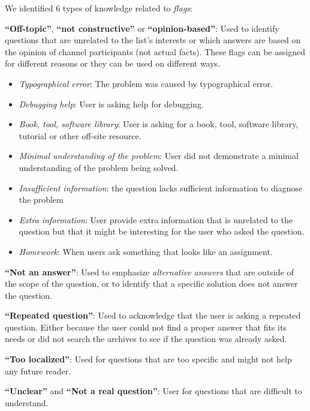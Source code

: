 \documentclass{sig-alternate-05-2015}
\begin{document}
	We identified 6 types of knowledge related to \textit{flags}:
	\begin{packed_enum}
		\item \textbf{``Off-topic''}, \textbf{``not constructive''} or \textbf{``opinion-based''}: Used to identify questions that are unrelated to the list's interests or which answers are based on the opinion of channel participants (not actual facts).
		These flags can be assigned for different reasons or they can be used on different ways.
		\begin{itemize}
			\item \textit{Typographical error}: The problem was caused by typographical error.
			\item \textit{Debugging help}: User is asking help for debugging.
			\item \textit{Book, tool, software library}: User is asking for a book, tool, software library, tutorial or other off-site resource.
			\item \textit{Minimal understanding of the problem}: User did not demonstrate a minimal understanding of the problem being solved.
			\item \textit{Insufficient information}: the question lacks sufficient information to diagnose the problem
			\item \textit{Extra information}: User provide extra information that is unrelated to the question but that it might be interesting for the user who asked the question.
			\item \textit{Homework}: When users ask something that looks like an assignment.
		\end{itemize}
		\item \textbf{``Not an answer''}: Used to emphasize \textit{alternative answers} that are outside of the scope of the question, or to identify that a specific solution does not answer the question.
		\item \textbf{``Repeated question''}: Used to acknowledge that the user is asking a repeated question. Either because the user could not find a proper answer that fits its needs or did not search the archives to see if the question was already asked.
		\item \textbf{``Too localized''}: Used for questions that are too specific and might not help any future reader.
		\item \textbf{``Unclear''} and  \textbf{``Not a real question''}: User for questions that are difficult to understand.
	\end{packed_enum}
\end{document}
